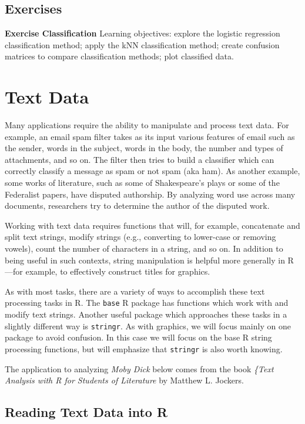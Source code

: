 \documentclass[
]{krantz}
\begin{document}
\hypertarget{exClass}{%
\section{Exercises}\label{exClass}}

\textbf{Exercise Classification} Learning objectives: explore the logistic regression classification method; apply the kNN classification method; create confusion matrices to compare classification methods; plot classified data.

\hypertarget{xml}{%
\chapter{Text Data}\label{xml}}

Many applications require the ability to manipulate and process text data. For example, an email spam filter takes as its input various features of email such as the sender, words in the subject, words in the body, the number and types of attachments, and so on. The filter then tries to build a classifier which can correctly classify a message as spam or not spam (aka ham). As another example, some works of literature, such as some of Shakespeare's plays or some of the Federalist papers, have disputed authorship. By analyzing word use across many documents, researchers try to determine the author of the disputed work.

Working with text data requires functions that will, for example, concatenate and split text strings, modify strings (e.g., converting to lower-case or removing vowels), count the number of characters in a string, and so on. In addition to being useful in such contexts, string manipulation is helpful more generally in R---for example, to effectively construct titles for graphics.

As with most tasks, there are a variety of ways to accomplish these text processing tasks in R. The \texttt{base} R package has functions which work with and modify text strings. Another useful package which approaches these tasks in a slightly different way is \texttt{stringr}. As with graphics, we will focus mainly on one package to avoid confusion. In this case we will focus on the base R string processing functions, but will emphasize that \texttt{stringr} is also worth knowing.

The application to analyzing \emph{Moby Dick} below comes from the book \emph{\{Text Analysis with R for Students of Literature} by Matthew L. Jockers.

\hypertarget{reading-text-data-into-r}{%
\section{Reading Text Data into R}\label{reading-text-data-into-r}}
\end{document}
